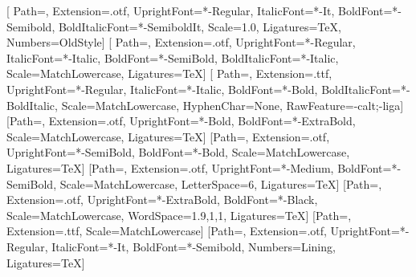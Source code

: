 \setmainfont{SourceSerif4}[
  Path=\GuideFontPath, Extension=.otf,
  UprightFont=*-Regular, ItalicFont=*-It,
  BoldFont=*-Semibold, BoldItalicFont=*-SemiboldIt,
  Scale=1.0, Ligatures=TeX, Numbers=OldStyle]
\setsansfont{Inter}[
  Path=\GuideFontPath, Extension=.otf,
  UprightFont=*-Regular, ItalicFont=*-Italic,
  BoldFont=*-SemiBold, BoldItalicFont=*-Italic,
  Scale=MatchLowercase, Ligatures=TeX]
\setmonofont{JetBrainsMono}[
  Path=\GuideFontPath, Extension=.ttf,
  UprightFont=*-Regular, ItalicFont=*-Italic,
  BoldFont=*-Bold, BoldItalicFont=*-BoldItalic,
  Scale=MatchLowercase, HyphenChar=None,
  RawFeature={-calt;-liga}]%
\newfontfamily{}[Path=\GuideFontPath, Extension=.otf,
  UprightFont=*-Bold, BoldFont=*-ExtraBold, Scale=MatchLowercase, Ligatures=TeX]
\newfontfamily{}[Path=\GuideFontPath, Extension=.otf,
  UprightFont=*-SemiBold, BoldFont=*-Bold, Scale=MatchLowercase, Ligatures=TeX]
\newfontfamily{}[Path=\GuideFontPath, Extension=.otf,
  UprightFont=*-Medium, BoldFont=*-SemiBold, Scale=MatchLowercase,
  LetterSpace=6, Ligatures=TeX]
\newfontfamily{}[Path=\GuideFontPath, Extension=.otf,
  UprightFont=*-ExtraBold, BoldFont=*-Black, Scale=MatchLowercase, WordSpace={1.9,1,1},
  Ligatures=TeX]
\newfontfamily{}[Path=\GuideFontPath, Extension=.ttf,
  Scale=MatchLowercase]
\newcommand{\GuideSym}[1]{{\GuideSymbolFont #1}}
\newfontfamily{}[Path=\GuideFontPath, Extension=.otf,
  UprightFont=*-Regular, ItalicFont=*-It, BoldFont=*-Semibold, Numbers=Lining,
  Ligatures=TeX]

